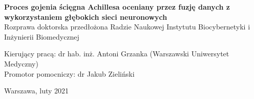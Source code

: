 \begin{onehalfspacing}
\begin{center}
{\large{
\textbf
{Proces gojenia ścięgna Achillesa oceniany przez fuzję danych z wykorzystaniem głębokich sieci neuronowych}} \\[2.3cm]
\large
{Rozprawa doktorska przedłożona Radzie Naukowej Instytutu Biocybernetyki i Inżynierii Biomedycznej \\[1.3cm]}}




\begin{flushleft}
Kierujący pracą:  dr hab. inż. Antoni Grzanka (Warszawski Uniwersytet Medyczny) \\
Promotor pomocniczy:  dr Jakub Zieliński \\
\end{flushleft}

\vspace{1cm}
Warszawa, luty 2021
\end{center}
\end{onehalfspacing}

\singlespacing
\newpage
\thispagestyle{empty}
\mbox{}



\doublespacing
\newpage
\thispagestyle{empty}
\mbox{}

\setcounter{page}{0} \pagestyle{plain}


\tableofcontents



\pagestyle{fancy}
